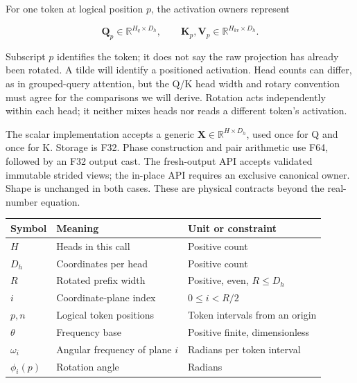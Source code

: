 For one token at logical position \(p\), the activation owners represent

\begin{equation}
\mathbf{Q}_p\in\mathbb{R}^{H_q\times D_h},\qquad
\mathbf{K}_p,\mathbf{V}_p\in\mathbb{R}^{H_{kv}\times D_h}.
\end{equation}

Subscript \(p\) identifies the token; it does not say the raw projection
has already been rotated. A tilde will identify a positioned activation.
Head counts can differ, as in grouped-query attention, but the Q/K head
width and rotary convention must agree for the comparisons we will
derive. Rotation acts independently within each head; it neither mixes
heads nor reads a different token's activation.

The scalar implementation accepts a generic \(\mathbf{X}\in
\mathbb{R}^{H\times D_h}\), used once for Q and once for K. Storage is
F32. Phase construction and pair arithmetic use F64, followed by an F32
output cast. The fresh-output API accepts validated immutable strided
views; the in-place API requires an exclusive canonical owner. Shape is
unchanged in both cases. These are physical contracts beyond the
real-number equation.

{\def\LTcaptype{none} %
\begin{longtable}[]{@{}
  >{\raggedright\arraybackslash}p{}
  >{\raggedright\arraybackslash}p{}
  >{\raggedright\arraybackslash}p{}@{}}
\toprule\noalign{}
\begin{minipage}[b]{\linewidth}\raggedright
Symbol
\end{minipage} & \begin{minipage}[b]{\linewidth}\raggedright
Meaning
\end{minipage} & \begin{minipage}[b]{\linewidth}\raggedright
Unit or constraint
\end{minipage} \\
\midrule\noalign{}
\endhead
\bottomrule\noalign{}
\endlastfoot
\(H\) & Heads in this call & Positive count \\
\(D_h\) & Coordinates per head & Positive count \\
\(R\) & Rotated prefix width & Positive, even, \(R\le D_h\) \\
\(i\) & Coordinate-plane index & \(0\le i<R/2\) \\
\(p,n\) & Logical token positions & Token intervals from an origin \\
\(\theta\) & Frequency base & Positive finite, dimensionless \\
\(\omega_i\) & Angular frequency of plane \(i\) & Radians per token
interval \\
\(\phi_i(p)\) & Rotation angle & Radians \\
\end{longtable}
}


